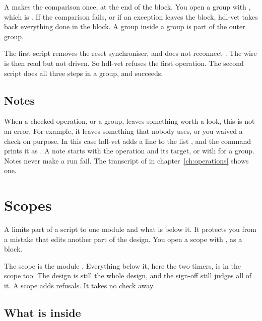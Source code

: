 A  makes the comparison once, at the end of the block. You open
a group with , which is . If the comparison fails, or if
an exception leaves the block, hdl-vet takes back everything done in the block. A group
inside a group is part of the outer group.




The first script removes the reset synchroniser, and does not reconnect
. The wire  is then read but not driven. So
hdl-vet refuses the first operation. The second script does all three steps in a group,
and succeeds.



\subsection*{Notes}

When a checked operation, or a group, leaves something worth a look, this is
not an error. For example, it leaves something that nobody uses, or you waived a check
on purpose. In this case hdl-vet adds a line to the list , and the command
prints it as . A note starts with the operation and its target,
or with  for a group. Notes never make a run fail. The transcript of
 in chapter~\ref{ch:operations} shows one.

\section{Scopes}

A  limits part of a script to one module and what is below it. It
protects you from a mistake that edits another part of the design. You
open a scope with , as a  block.



The scope is the module . Everything below it,
here the two timers, is in the scope too. The design is still the whole design,
and the sign-off still judges all of it. A scope adds refusals. It takes no check
away.

\subsection*{What is inside}

